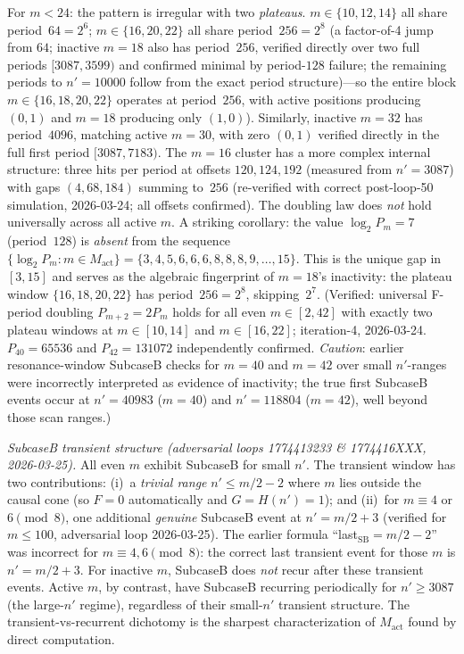 \documentclass[11pt]{article}
\theoremstyle{plain}
\theoremstyle{definition}
\begin{document}
For $m < 24$: the pattern is irregular with two \emph{plateaus}.
$m \in \{10, 12, 14\}$ all share period~$64 = 2^6$;
$m \in \{16, 20, 22\}$ all share period~$256 = 2^8$
(a factor-of-4 jump from $64$; inactive $m=18$ also has period~$256$, verified
directly over two full periods $[3087, 3599)$ and confirmed minimal by period-$128$ failure;
the remaining periods to $n'=10000$ follow from the exact period structure)---so the
entire block $m \in \{16, 18, 20, 22\}$ operates at period~$256$, with active positions
producing $(0,1)$ and $m=18$ producing only $(1,0)$).
Similarly, inactive $m=32$ has period~$4096$, matching active $m=30$,
with zero $(0,1)$ verified directly in the full first period $[3087, 7183)$.
The $m=16$ cluster has a more complex internal structure: three hits per period at offsets
$120,124,192$ (measured from $n'=3087$) with gaps $(4, 68, 184)$ summing to~$256$
(re-verified with correct post-loop-50 simulation, 2026-03-24; all offsets confirmed).
The doubling law does \emph{not} hold universally across all active $m$.
A striking corollary: the value $\log_2 P_m = 7$ (period~$128$) is \emph{absent} from
the sequence $\{\log_2 P_m : m \in M_{\mathrm{act}}\} = \{3,4,5,6,6,6,8,8,8,9,\ldots,15\}$.
This is the unique gap in $[3,15]$ and serves as the algebraic fingerprint of $m=18$'s
inactivity: the plateau window $\{16,18,20,22\}$ has period~$256=2^8$, skipping~$2^7$.
(Verified: universal F-period doubling $P_{m+2}=2P_m$ holds for all even $m \in [2,42]$
with exactly two plateau windows at $m \in [10,14]$ and $m \in [16,22]$; iteration-4, 2026-03-24.
$P_{40}=65536$ and $P_{42}=131072$ independently confirmed.
\emph{Caution}: earlier resonance-window SubcaseB checks for $m=40$ and $m=42$ over small
$n'$-ranges were incorrectly interpreted as evidence of inactivity; the true first SubcaseB
events occur at $n'=40983$ ($m=40$) and $n'=118804$ ($m=42$), well beyond those scan ranges.)

\emph{SubcaseB transient structure (adversarial loops 1774413233 \& 1774416XXX, 2026-03-25).}
All even $m$ exhibit SubcaseB for small $n'$.  The transient window has two contributions:
(i)~a \emph{trivial range} $n' \leq m/2-2$ where $m$ lies outside the causal cone
(so $F=0$ automatically and $G = H(n') = 1$); and
(ii)~for $m \equiv 4$ or $6 \pmod{8}$, one additional \emph{genuine} SubcaseB event
at $n' = m/2+3$ (verified for $m \leq 100$, adversarial loop 2026-03-25).
The earlier formula ``last$_{\mathrm{SB}} = m/2-2$'' was incorrect for $m \equiv 4,6 \pmod{8}$:
the correct last transient event for those $m$ is $n' = m/2+3$.
For inactive $m$, SubcaseB does \emph{not} recur after these transient events.
Active $m$, by contrast, have SubcaseB recurring periodically for $n' \geq 3087$
(the large-$n'$ regime), regardless of their small-$n'$ transient structure.
The transient-vs-recurrent dichotomy is the sharpest characterization of $M_{\mathrm{act}}$
found by direct computation.
\end{document}

